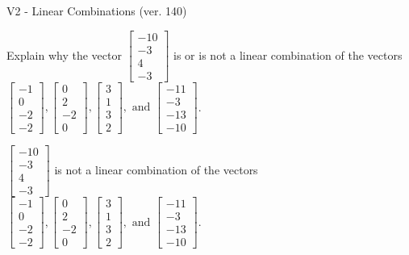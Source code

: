 \begin{exercise}
  \begin{exerciseTitle}V2 - Linear Combinations (ver. 140)\end{exerciseTitle}
  \begin{exerciseStatement}
    Explain why the vector \(\left[\begin{array}{c}
-10 \\
-3 \\
4 \\
-3
\end{array}\right]\)  is or is not a linear 
	combination of the vectors \(\left[\begin{array}{c}
-1 \\
0 \\
-2 \\
-2
\end{array}\right] , \left[\begin{array}{c}
0 \\
2 \\
-2 \\
0
\end{array}\right] , \left[\begin{array}{c}
3 \\
1 \\
3 \\
2
\end{array}\right] , \text{ and } \left[\begin{array}{c}
-11 \\
-3 \\
-13 \\
-10
\end{array}\right]\).
	


  \end{exerciseStatement}
  \begin{exerciseAnswer}
   \(\left[\begin{array}{c}
-10 \\
-3 \\
4 \\
-3
\end{array}\right]\) 
  	 is not  
	a linear combination of the vectors \(\left[\begin{array}{c}
-1 \\
0 \\
-2 \\
-2
\end{array}\right] , \left[\begin{array}{c}
0 \\
2 \\
-2 \\
0
\end{array}\right] , \left[\begin{array}{c}
3 \\
1 \\
3 \\
2
\end{array}\right] , \text{ and } \left[\begin{array}{c}
-11 \\
-3 \\
-13 \\
-10
\end{array}\right]\).


\end{exerciseAnswer}
\end{exercise}
